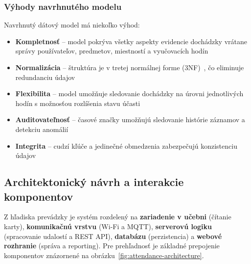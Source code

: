 \subsubsection{Výhody navrhnutého modelu}

Navrhnutý dátový model má niekoľko výhod:

\begin{itemize}
    \item \textbf{Kompletnosť} -- model pokrýva všetky aspekty evidencie dochádzky vrátane správy používateľov, predmetov, miestností a vyučovacích hodín
    \item \textbf{Normalizácia} -- štruktúra je v tretej normálnej forme (3NF)~\cite{ramakrishnan:dbms}, čo eliminuje redundanciu údajov
    \item \textbf{Flexibilita} -- model umožňuje sledovanie dochádzky na úrovni jednotlivých hodín s možnosťou rozlíšenia stavu účasti
    \item \textbf{Auditovateľnosť} -- časové značky umožňujú sledovanie histórie záznamov a detekciu anomálií
    \item \textbf{Integrita} -- cudzí kľúče a jedinečné obmedzenia zabezpečujú konzistenciu údajov
\end{itemize}


\subsection{Architektonický návrh a interakcie komponentov}
Z hľadiska prevádzky je systém rozdelený na \textbf{zariadenie v učebni} (čítanie karty), \textbf{komunikačnú vrstvu} (Wi-Fi a MQTT), \textbf{serverovú logiku} (spracovanie udalostí a REST API), \textbf{databázu} (perzistencia) a \textbf{webové rozhranie} (správa a reporting). Pre prehľadnosť je základné prepojenie komponentov znázornené na obrázku~\ref{fig:attendance-architecture}.

